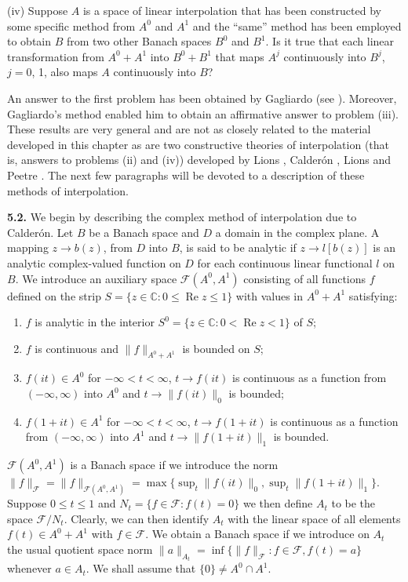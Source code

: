 \textup{(iv)} Suppose $A$ is a space of linear interpolation that has been
constructed by some specific method from $A^{0}$ and $A^{1}$ and the ``same''
method has been employed to obtain $B$ from two other Banach spaces $B^{0}$ and
$B^{1}$. Is it true that each linear transformation from $A^{0} + A^{1}$ into
$B^{0} + B^{1}$ that maps $A^{j}$ continuously into $B^{j}$, $j = 0$, 1, also
maps $A$ continuously into $B$?

An answer to the first problem has been obtained by Gagliardo (see
\cite{Gagliardo1}). Moreover, Gagliardo's method enabled him to obtain an
affirmative answer to problem (iii). These results are very general and are not
as closely related to the material developed in this chapter as are two
constructive theories of interpolation (that is, answers to problems (ii) and
(iv)) developed by Lions \cite{Lions1}, Calder\'on \cite{Calderon2}, Lions and
Peetre \cite{LionsPeetre1}. The next few paragraphs will be devoted to a
description of these methods of interpolation.

\textbf{5.2.} We begin by describing the complex method of interpolation due
to Calder\'on. Let $B$ be a Banach space and $D$ a domain in the complex
plane. A mapping $z \to b(z)$, from $D$ into $B$, is said to be analytic if
$z \to l[b(z)]$ is an analytic complex-valued function on $D$ for each
continuous linear functional $l$ on $B$. We introduce an auxiliary space
$\mathcal{F}(A^{0}, A^{1})$ consisting of all functions $f$ defined on the
strip $S = \{z \in \mathbb{C} : 0 \leq \operatorname{Re} z \leq 1\}$ with
values in $A^{0} + A^{1}$ satisfying:

\begin{enumerate}[label=(\arabic*),leftmargin=*,itemsep=0pt]
\item $f$ is analytic in the interior
$S^{0} = \{z \in \mathbb{C} : 0 < \operatorname{Re} z < 1\}$ of $S$;
\item $f$ is continuous and $\|f\|_{A^{0}+A^{1}}$ is bounded on $S$;
\item $f(it) \in A^{0}$ for $-\infty < t < \infty$,
$t \to f(it)$ is continuous as a function from $(-\infty, \infty)$ into $A^{0}$
and $t \to \|f(it)\|_{0}$ is bounded;
\item $f(1 + it) \in A^{1}$ for $-\infty < t < \infty$,
$t \to f(1 + it)$ is continuous as a function from $(-\infty, \infty)$ into
$A^{1}$ and $t \to \|f(1 + it)\|_{1}$ is bounded.
\end{enumerate}

$\mathcal{F}(A^{0}, A^{1})$ is a Banach space if we introduce the norm
$\|f\|_{\mathcal{F}} = \|f\|_{\mathcal{F}(A^{0}, A^{1})} = \max\{\sup_{t}\|f(it)\|_{0}, \sup_{t}\|f(1 + it)\|_{1}\}$.
Suppose $0 \leq t \leq 1$ and $N_{t} = \{f \in \mathcal{F} : f(t) = 0\}$ we
then define $A_{t}$ to be the space $\mathcal{F}/N_{t}$. Clearly, we can then
identify $A_{t}$ with the linear space of all elements
$f(t) \in A^{0} + A^{1}$ with $f \in \mathcal{F}$. We obtain a Banach space if
we introduce on $A_{t}$ the usual quotient space norm
$\|a\|_{A_{t}} = \inf\{\|f\|_{\mathcal{F}} : f \in \mathcal{F}, f(t) = a\}$
whenever $a \in A_{t}$. We shall assume that $\{0\} \neq A^{0} \cap A^{1}$.

